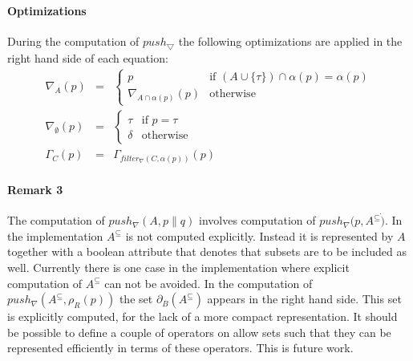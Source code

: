 \documentclass{article}
\begin{document}
\paragraph{Optimizations}

During the computation of $push_{\bigtriangledown }$ the following
optimizations are applied in the right hand side of each equation:%
\[
\begin{array}{lll}
\nabla _{A}(p) & = & \left\{ 
\begin{array}{ll}
p & \text{if }(A\cup \{\tau \})\cap \alpha (p)=\alpha (p) \\ 
\nabla _{A\cap \alpha (p)}(p) & \text{otherwise}%
\end{array}%
\right. \\ 
\nabla _{\emptyset }(p) & = & \left\{ 
\begin{array}{ll}
\tau & \text{if }p=\tau \\ 
\delta & \text{otherwise}%
\end{array}%
\right. \\ 
\Gamma _{C}(p) & = & \Gamma _{filter_{\nabla }(C,\alpha (p))}(p)%
\end{array}%
\]

\paragraph{Remark 3}

The computation of $push_{\nabla }(A,p\parallel q)$ involves computation of $%
push_{\nabla }(p,A^{\subseteq }\dot{)}$. In the implementation $A^{\subseteq
}$ is not computed explicitly. Instead it is represented by $A$ together
with a boolean attribute that denotes that subsets are to be included as
well. Currently there is one case in the implementation where explicit
computation of $A^{\subseteq }$ can not be avoided. In the computation of $%
push_{\nabla }(A^{\subseteq },\rho _{R}(p))$ the set $\partial
_{B}(A^{\subseteq })$ appears in the right hand side. This set is explicitly
computed, for the lack of a more compact representation. It should be
possible to define a couple of operators on allow sets such that they can be
represented efficiently in terms of these operators. This is future work.
\end{document}
